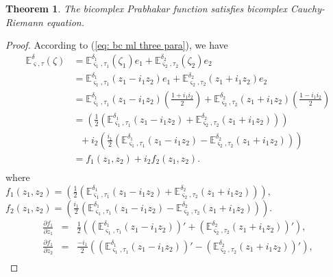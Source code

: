 \documentclass[a4paper,12pt]{article}
\newtheorem{theorem}{Theorem}[section]
\theoremstyle{remark}
\begin{document}
\begin{theorem}
	The bicomplex Prabhakar function satisfies bicomplex Cauchy-Riemann equation.
\end{theorem}
\begin{proof}
    According to (\ref{eq: bc ml three para}), we have
	\begin{equation}
	\begin{split}
	\mathbb{E}^\delta_{ \varsigma,\tau}(\zeta)&=\mathbb{E}^{\delta_1}_{ \varsigma_1,\tau_1}(\zeta_1)e_1+\mathbb{E}^{\delta_2}_{ \varsigma_2,\tau_2}(\zeta_2)e_2\\
	&=\mathbb{E}^{\delta_1}_{ \varsigma_1,\tau_1}(z_1 - i_1z_2)e_1+\mathbb{E}^{\delta_2}_{ \varsigma_2,\tau_2}(z_1 + i_1z_2)e_2\\
	&=\mathbb{E}^{\delta_1}_{ \varsigma_1,\tau_1}(z_1 - i_1z_2)\left( \frac{1 +i_1i_2}{2}\right) +\mathbb{E}^{\delta_2}_{ \varsigma_2,\tau_2}(z_1 + i_1z_2)\left( \frac{1 - i_1i_2}{2}\right) \\
	&=\left( \frac{1}{2}\left( \mathbb{E}^{\delta_1}_{ \varsigma_1,\tau_1}(z_1 - i_1z_2)+\mathbb{E}^{\delta_2}_{ \varsigma_2,\tau_2}(z_1 +  i_1z_2)\right) \right)\\
	&~~~+i_2 \left( \frac{i_1}{2}\left( \mathbb{E}^{\delta_1}_{ \varsigma_1,\tau_1}(z_1 - i_1z_2)-\mathbb{E}^{\delta_2}_{ \varsigma_2,\tau_2}(z_1 +  i_1z_2)\right) \right)\\
	&=f_1(z_1,z_2)+i_2f_2(z_1,z_2).\\
	\end{split}
	\end{equation}
	where\\
	$f_1(z_1,z_2)=\left( \frac{1}{2}\left( \mathbb{E}^{\delta_1}_{ \varsigma_1,\tau_1}(z_1 - i_1z_2)+\mathbb{E}^{\delta_2}_{ \varsigma_2,\tau_2}(z_1 +  i_1z_2)\right) \right),$\\
	$f_2(z_1,z_2)= \left( \frac{i_1}{2}\left( \mathbb{E}^{\delta_1}_{ \varsigma_1,\tau_1}(z_1 - i_1z_2)-\mathbb{E}^{\delta_2}_{ \varsigma_2,\tau_2}(z_1 +  i_1z_2)\right) \right).$\\
	\begin{eqnarray}
	\frac{\partial f_1}{\partial z_1 }&=&\frac{1}{2}\left( \left( \mathbb{E} _{ \varsigma_1,\tau_1}^{\delta_1 }(z_1 - i_1z_2)\right) '+\left( \mathbb{E}^{\delta_2}_{ \varsigma_2,\tau_2}(z_1 +  i_1z_2)\right) '\right), \nonumber\\
	\frac{\partial f_1}{\partial z_2 }&=&\frac{-i_1}{2}\left(\left(  \mathbb{E}^{\delta_1}_{ \varsigma_1,\tau_1}(z_1 - i_1z_2)\right) '-\left( \mathbb{E}^{\delta_2}_{ \varsigma_2,\tau_2}(z_1 +  i_1z_2)\right)'\right) ,\nonumber\\

\end{eqnarray}
\end{proof}
\end{document}
